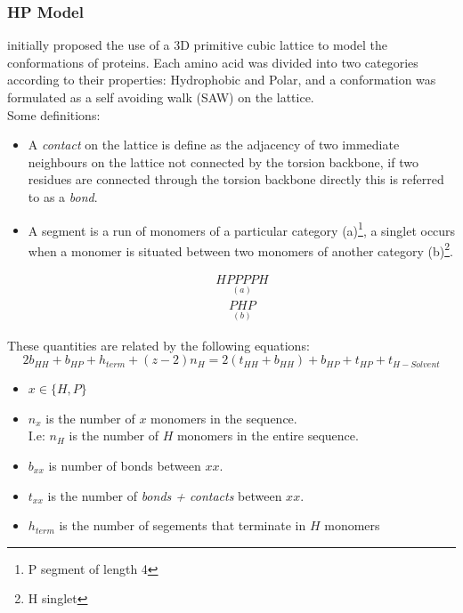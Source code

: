 \subsubsection{HP Model}
\cite{Yue} initially proposed the use of a 3D primitive cubic lattice to model the conformations
of proteins. Each amino acid was divided into two categories according to their properties:
Hydrophobic and Polar, and a conformation was formulated as a self avoiding walk (SAW) on the lattice.
\\ Some definitions:
\begin{itemize}
    \item A \emph{contact} on the lattice is define as the adjacency of two immediate neighbours on the lattice
    not connected by the torsion backbone, if two residues are connected 
    through the torsion backbone directly this is referred to 
    as a \emph{bond}.
    \item A segment is a run of monomers of a particular category (a)\footnote{P segment of length 4}, a singlet
          occurs when a monomer is situated between two monomers of another category (b)\footnote{H singlet}.

    \begin{multicols}{2}
        \noindent
        \begin{align*}
            \underset{(a)}{HPPPPH} 
        \end{align*}
        \begin{align*}
            \underset{(b)}{PHP}
        \end{align*}
    \end{multicols}
\end{itemize}
These quantities are related by the following equations:
\begin{equation}
    2b_{HH} + b_{HP} + h_{term} + (z-2)n_H = 2(t_{HH} + b_{HH}) + b_{HP} + t_{HP} + t_{H-Solvent}
\end{equation}
\begin{itemize}
    \item $x \in \{H,P\}$
    \item $n_x$ is the number of $x$ monomers in the sequence. \\
        I.e: $n_H$ is the number of $H$ monomers in the entire sequence.
    \item $b_{xx}$ is number of bonds between $xx$.
    \item $t_{xx}$ is the number of \emph{bonds + contacts} between $xx$.
    \item $h_{term}$ is the number of segements that terminate in $H$ monomers
\end{itemize}
